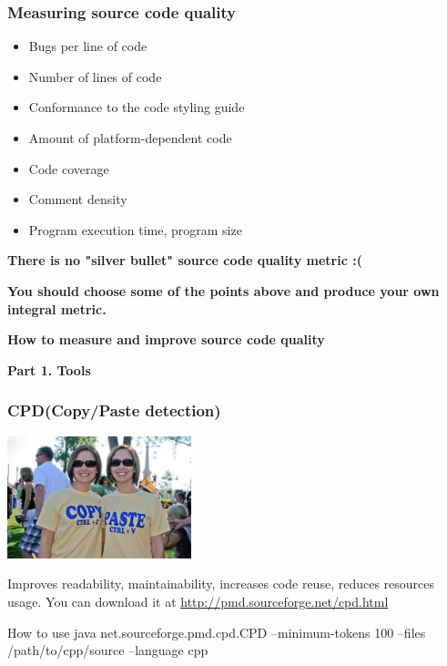 \documentclass{beamer}
\begin{document}
\begin{frame}
\frametitle{Measuring source code quality}
\begin{itemize}
\item Bugs per line of code
\item Number of lines of code
\item Conformance to the code styling guide
\item Amount of platform-dependent code
\item Code coverage
\item Comment density
\item Program execution time, program size
\end{itemize}
\begin{center}
\textbf{There is no "silver bullet" source code quality metric :(}

\textbf{You should choose some of the points above and produce your own integral metric.}
\end{center}
\end{frame}

\begin{frame}
\begin{block}{\begin{center}\Large\textbf{How to measure and improve source code quality}\end{center}}
\begin{center}
\textbf{Part 1. Tools}
\end{center}
\end{block}
\end{frame}

\begin{frame}
\frametitle{CPD(Copy/Paste detection)}
\begin{center}
\includegraphics[width=0.4\textwidth]{img/copy-paste}
\end{center}
Improves readability, maintainability, increases code reuse, reduces resources usage. You can download it at \url{http://pmd.sourceforge.net/cpd.html}
\begin{exampleblock}{How to use}
java net.sourceforge.pmd.cpd.CPD --minimum-tokens 100 --files /path/to/cpp/source --language cpp
\end{exampleblock}
\end{frame}
\end{document}
